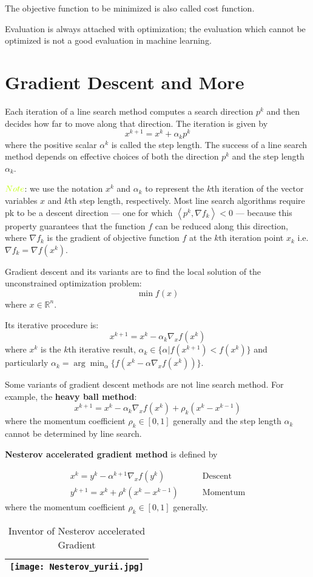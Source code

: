 \documentclass[titlestyle=hang,11pt]{elegantbook}
\begin{document}
The objective function to be minimized is also called cost function.

Evaluation is always attached with optimization; the evaluation which cannot be optimized is not a good evaluation in machine learning.


\section{Gradient Descent and More}

Each iteration of a line search method computes a search direction $p^{k}$ and then decides how
far to move along that direction. The iteration is given by
$$ x^{k+1}=x^{k}+\alpha_{k}p^{k}\tag{Line search} $$
where the positive scalar $\alpha^{k}$ is called the step length. The success of a line search method
depends on effective choices of both the direction $p^{k}$ and the step length $\alpha_{k}$.

$\color{lime}{Note}$: we use the notation $x^{k}$ and $\alpha_k$ to represent the $k$th iteration of the vector variables $x$ and $k$th step length, respectively.
Most line search algorithms require pk to be a descent direction — one for which
$\left< {p^k},\nabla f_k \right> < 0$ — because this property guarantees that the function $f$ can be reduced along this direction, where $\nabla f_k$ is the gradient of objective function $f$ at the $k$th iteration point $x_k$ i.e. $\nabla f_k=\nabla f(x^{k})$.

Gradient descent and its variants are to find the local solution of  the unconstrained optimization problem:
$$
\min f(x)
$$
where $x\in \mathbb{R}^{n}$.

Its iterative procedure is:
$$x^{k+1}=x^{k}-\alpha_{k}\nabla_{x}f(x^k)$$
where $x^{k}$ is the $k$th iterative result, $\alpha_{k}\in\{\alpha|f(x^{k+1})< f(x^{k})\}$ and particularly $\alpha_{k}=\arg\min_{\alpha}\{f(x^{k}-\alpha\nabla_{x}f(x^{k}))\}$.

Some variants of gradient descent methods are not line search method.
For example, the \textbf{heavy ball method}:
$$
x^{k+1}=x^{k}-\alpha_{k}\nabla_{x}f(x^k)+\rho_{k}(x^k-x^{k-1})
$$
where the momentum coefficient $\rho_k\in[0,1]$ generally and the step length $\alpha_k$ cannot be determined by line search.

\textbf{Nesterov accelerated gradient method} is defined by

\begin{align}
x^{k}=y^{k}-\alpha^{k+1}\nabla_{x}f(y^k) \qquad &\text{Descent} \\
y^{k+1}=x^{k}+\rho^{k}(x^{k}-x^{k-1})   \qquad  &\text{Momentum}
\end{align}
where the momentum coefficient $\rho_k\in[0,1]$ generally.
\begin{table}[h]
	\centering
	\caption{Inventor of Nesterov accelerated Gradient}
	\begin{tabular}{|c|}
		\hline
		\texttt{[image: Nesterov\_yurii.jpg]}  \\
		\hline
	\end{tabular}
\end{table}
\end{document}
